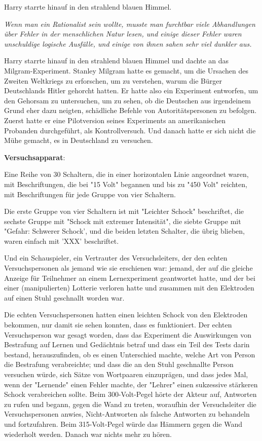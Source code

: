 {Harry starrte hinauf in den strahlend blauen Himmel.

\emph{Wenn man ein Rationalist sein wollte, musste man furchtbar viele Abhandlungen über Fehler in der menschlichen Natur lesen, und einige dieser Fehler waren unschuldige logische Ausfälle, und einige von ihnen sahen sehr viel dunkler aus.}

Harry starrte hinauf in den strahlend blauen Himmel und dachte an das Milgram-Experiment. Stanley Milgram hatte es gemacht, um die Ursachen des Zweiten Weltkriegs zu erforschen, um zu verstehen, warum die Bürger Deutschlands Hitler gehorcht hatten. Er hatte also ein Experiment entworfen, um den Gehorsam zu untersuchen, um zu sehen, ob die Deutschen aus irgendeinem Grund eher dazu neigten, schädliche Befehle von Autoritätspersonen zu befolgen. Zuerst hatte er eine Pilotversion seines Experiments an amerikanischen Probanden durchgeführt, als Kontrollversuch. Und danach hatte er sich nicht die Mühe gemacht, es in Deutschland zu versuchen.

\textbf{Versuchsapparat}:

Eine Reihe von 30 Schaltern, die in einer horizontalen Linie angeordnet waren, mit Beschriftungen, die bei "15 Volt" begannen und bis zu "450 Volt" reichten, mit Beschriftungen für jede Gruppe von vier Schaltern.

Die erste Gruppe von vier Schaltern ist mit "Leichter Schock" beschriftet, die sechste Gruppe mit "Schock mit extremer Intensität", die siebte Gruppe mit "Gefahr: Schwerer Schock', und die beiden letzten Schalter, die übrig blieben, waren einfach mit 'XXX' beschriftet.

Und ein Schauspieler, ein Vertrauter des Versuchsleiters, der den echten Versuchspersonen als jemand wie sie erschienen war: jemand, der auf die gleiche Anzeige für Teilnehmer an einem Lernexperiment geantwortet hatte, und der bei einer (manipulierten) Lotterie verloren hatte und zusammen mit den Elektroden auf einen Stuhl geschnallt worden war.

Die echten Versuchspersonen hatten einen leichten Schock von den Elektroden bekommen, nur damit sie sehen konnten, dass es funktioniert. Der echten Versuchsperson war gesagt worden, dass das Experiment die Auswirkungen von Bestrafung auf Lernen und Gedächtnis betraf und dass ein Teil des Tests darin bestand, herauszufinden, ob es einen Unterschied machte, welche Art von Person die Bestrafung verabreichte; und dass die an den Stuhl geschnallte Person versuchen würde, sich Sätze von Wortpaaren einzuprägen, und dass jedes Mal, wenn der "Lernende" einen Fehler machte, der "Lehrer" einen sukzessive stärkeren Schock verabreichen sollte. Beim 300-Volt-Pegel hörte der Akteur auf, Antworten zu rufen und begann, gegen die Wand zu treten, woraufhin der Versuchsleiter die Versuchspersonen anwies, Nicht-Antworten als falsche Antworten zu behandeln und fortzufahren. Beim 315-Volt-Pegel würde das Hämmern gegen die Wand wiederholt werden. Danach war nichts mehr zu hören.

}

